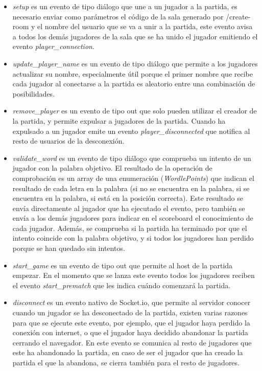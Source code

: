 \begin{itemize}
	\item \textit{setup} es un evento de tipo diálogo que une a un jugador a la partida, es necesario enviar como parámetros el código de la sala generado por /create-room y el nombre del usuario que se va a unir a la partida, este evento avisa a todos los demás jugadores de la sala que se ha unido el jugador emitiendo el evento \textit{player\_connection}.
	\item \textit{update\_player\_name} es un evento de tipo diálogo que permite a los jugadores actualizar su nombre, especialmente útil porque el primer nombre que recibe cada jugador al conectarse a la partida es aleatorio entre una combinación de posibilidades.
	\item \textit{remove\_player} es un evento de tipo out que solo pueden utilizar el creador de la partida, y permite expulsar a jugadores de la partida. Cuando ha expulsado a un jugador emite un evento \textit{player\_disconnected} que notifica al resto de usuarios de la desconexión.
	\item \textit{validate\_word} es un evento de tipo diálogo que comprueba un intento de un jugador con la palabra objetivo. El resultado de la operación de comprobación es un array de una enumeración (\textit{WordlePoints}) que indican el resultado de cada letra en la palabra (si no se encuentra en la palabra, si se encuentra en la palabra, si está en la posición correcta). Este resultado se envía directamente al jugador que ha ejecutado el evento, pero también se envía a los demás jugadores para indicar en el scoreboard el conocimiento de cada jugador. Además, se comprueba si la partida ha terminado por que el intento coincide con la palabra objetivo, y si todos los jugadores han perdido porque se han quedado sin intentos.
	\item \textit{start\_game} es un evento de tipo out que permite al host de la partida empezar. En el momento que se lanza este evento todos los jugadores reciben el evento \textit{start\_prematch} que les indica cuándo comenzará la partida.
	\item \textit{disconnect} es un evento nativo de Socket.io, que permite al servidor conocer cuando un jugador se ha desconectado de la partida, existen varias razones para que se ejecute este evento, por ejemplo, que el jugador haya perdido la conexión con internet, o que el jugador haya decidido abandonar la partida cerrando el navegador. En este evento se comunica al resto de jugadores que este ha abandonado la partida, en caso de ser el jugador que ha creado la partida el que la abandona, se cierra también para el resto de jugadores.
\end{itemize}



